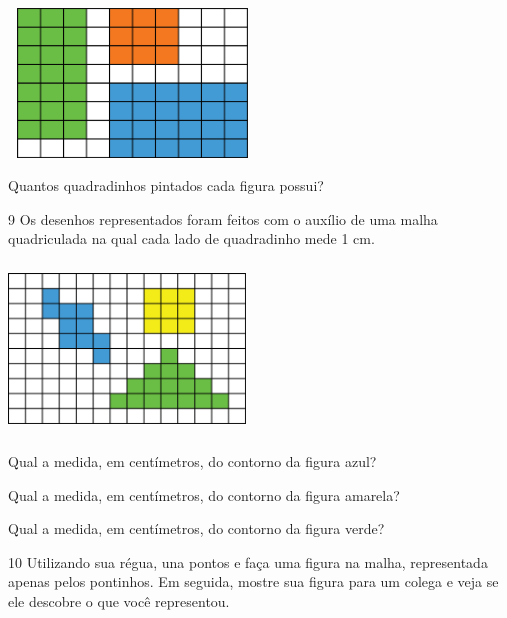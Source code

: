 \begin{multicols}{2}
\includegraphics[width=2.59189in,height=1.55847in]{media/image56.png}

Quantos quadradinhos pintados cada figura possui?




\num{9} Os desenhos representados foram feitos com o auxílio de uma malha
quadriculada na qual cada lado de quadradinho mede 1 cm.


\includegraphics[width=2.47521in,height=1.77515in]{media/image57.png}

\begin{escolha}
\item Qual a medida, em centímetros, do contorno da figura azul?

\reduline{18 cm\hfill}

\item Qual a medida, em centímetros, do contorno da figura amarela?

\reduline{12 cm\hfill}

\item Qual a medida, em centímetros, do contorno da figura verde?

\reduline{22 cm\hfill}
\end{escolha}

\num{10} Utilizando sua régua, una pontos e faça uma figura na malha, representada apenas pelos pontinhos. Em seguida, mostre sua
figura para um colega e veja se ele descobre o que você representou.


\end{multicols}
